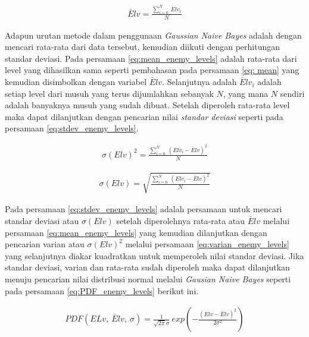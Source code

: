 \begin{equation}\label{eq:mean_enemy_levels}
\begin{split}
\bar{E}lv = \frac{\sum_{i = 0}^{N}\ Elv_{i}}{N}
\end{split}
\end{equation}

Adapun urutan metode dalam penggunaan \textit{Gaussian Naive Bayes} adalah dengan mencari rata-rata dari data tersebut, kemudian diikuti dengan perhitungan standar deviasi. Pada persamaan \ref{eq:mean_enemy_levels} adalah rata-rata dari level yang dihasilkan sama seperti pembahasan pada persamaan \ref{eq: mean} yang kemudian disimbolkan dengan variabel $\bar{E}lv$. Selanjutnya adalah $\bar{E}lv_{i}$ adalah setiap level dari musuh yang terus dijumlahkan sebanyak $N$, yang mana $N$ sendiri adalah banyaknya musuh yang sudah dibuat. Setelah diperoleh rata-rata level maka dapat dilanjutkan dengan pencarian nilai \textit{standar deviasi} seperti pada persamaan \ref{eq:stdev_enemy_levels}.
\vspace{1ex}

\begin{equation}\label{eq:varian_enemy_levels}
\begin{split}
\sigma(Elv)^2 = \frac{\sum_{i = 0}^{N}\ (Elv_{i} - \bar{E}lv)^{2}}{N}
\end{split}
\end{equation}

\begin{equation}\label{eq:stdev_enemy_levels}
\begin{split}
\sigma(Elv) = \sqrt{\frac{\sum_{i = 0}^{N}\ (Elv_{i} - \bar{E}lv)^{2}}{N}}
\end{split}
\end{equation}

Pada persamaan \ref{eq:stdev_enemy_levels} adalah persamaan untuk mencari standar deviasi atau $\sigma(Elv)$ setelah diperolehnya rata-rata atau $\bar{E}lv$ melalui persamaan \ref{eq:mean_enemy_levels} yang kemudian dilanjutkan dengan pencarian varian atau $\sigma(Elv)^2$ melalui persamaan \ref{eq:varian_enemy_levels} yang selanjutnya diakar kuadratkan untuk memperoleh nilai standar deviasi. Jika standar deviasi, varian dan rata-rata sudah diperoleh maka dapat dilanjutkan menuju pencarian nilai distribusi normal melalui \textit{Gausian Naive Bayes} seperti pada persamaan \ref{eq:PDF_enemy_levels} berikut ini.
\vspace{1ex}

\begin{equation}\label{eq:PDF_enemy_levels}
\begin{split}
PDF(ELv,\ \bar{E}lv,\ \sigma) = \frac{1}{\sqrt{2 \pi} \sigma}\ exp \left(-\frac{(Elv - \bar{E}lv)^2}{2 \sigma^2}\right)
\end{split}
\end{equation}

